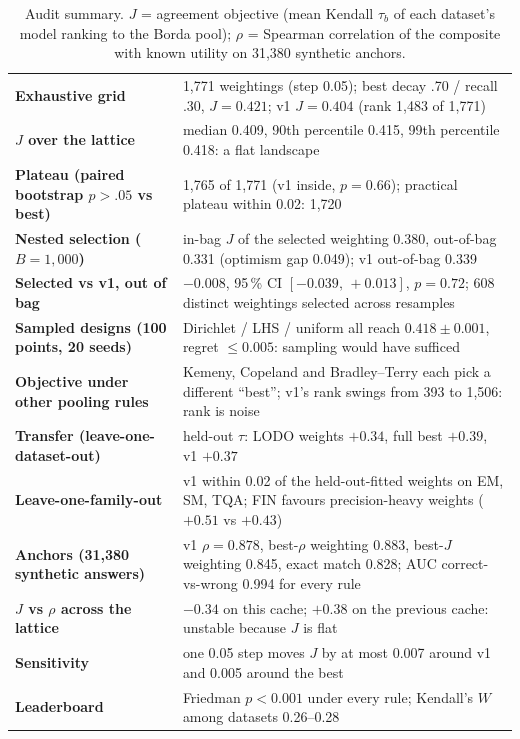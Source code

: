 \documentclass[11pt]{article}
\begin{document}
\begin{table}[htbp]
\centering\small
\caption{Audit summary. $J$ = agreement objective (mean Kendall $\tau_b$ of each dataset's model ranking to the Borda pool); $\rho$ = Spearman correlation of the composite with known utility on 31,380 synthetic anchors.}
\label{tab:summary}
\begin{tabularx}{\textwidth}{>{\bfseries}p{} L}
\toprule
Exhaustive grid & 1,771 weightings (step 0.05); best decay .70 / recall .30, $J=0.421$; v1 $J=0.404$ (rank 1,483 of 1,771) \\
$J$ over the lattice & median 0.409, 90th percentile 0.415, 99th percentile 0.418: a flat landscape \\
Plateau (paired bootstrap $p>.05$ vs best) & 1,765 of 1,771 (v1 inside, $p=0.66$); practical plateau within 0.02: 1,720 \\
Nested selection ($B=1{,}000$) & in-bag $J$ of the selected weighting 0.380, out-of-bag 0.331 (optimism gap 0.049); v1 out-of-bag 0.339 \\
Selected vs v1, out of bag & $-0.008$, 95\,\% CI $[-0.039,\,+0.013]$, $p=0.72$; 608 distinct weightings selected across resamples \\
Sampled designs (100 points, 20 seeds) & Dirichlet / LHS / uniform all reach $0.418\pm0.001$, regret $\le 0.005$: sampling would have sufficed \\
Objective under other pooling rules & Kemeny, Copeland and Bradley--Terry each pick a different ``best''; v1's rank swings from 393 to 1,506: rank is noise \\
Transfer (leave-one-dataset-out) & held-out $\tau$: LODO weights $+0.34$, full best $+0.39$, v1 $+0.37$ \\
Leave-one-family-out & v1 within 0.02 of the held-out-fitted weights on EM, SM, TQA; FIN favours precision-heavy weights ($+0.51$ vs $+0.43$) \\
Anchors (31,380 synthetic answers) & v1 $\rho=0.878$, best-$\rho$ weighting 0.883, best-$J$ weighting 0.845, exact match 0.828; AUC correct-vs-wrong 0.994 for every rule \\
$J$ vs $\rho$ across the lattice & $-0.34$ on this cache; $+0.38$ on the previous cache: unstable because $J$ is flat \\
Sensitivity & one 0.05 step moves $J$ by at most 0.007 around v1 and 0.005 around the best \\
Leaderboard & Friedman $p<0.001$ under every rule; Kendall's $W$ among datasets 0.26--0.28 \\

\end{tabularx}
\end{table}
\end{document}
